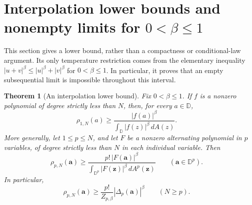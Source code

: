 \documentclass[11pt,a4paper]{article}
\numberwithin{equation}{section}
\newtheorem{theorem}{Theorem}[section]
\theoremstyle{definition}
\theoremstyle{remark}
\newcommand{\D}{\mathbb D}
\begin{document}
\section{Interpolation lower bounds and nonempty limits for \texorpdfstring{$0<\beta\le1$}{0<beta <= 1}}
\label{sec:subadditive-interpolation}

This section gives a lower bound, rather than a compactness or
conditional-law argument. Its only temperature restriction comes from
the elementary inequality $|u+v|^\beta\le |u|^\beta+|v|^\beta$ for
$0<\beta\le1$. In particular, it proves that an empty subsequential
limit is impossible throughout this interval.

\begin{theorem}[An interpolation lower bound]
\label{thm:subadditive-interpolation}
Fix $0<\beta\le1$. If $f$ is a nonzero polynomial of degree strictly
less than $N$, then, for every $a\in\D$,
\begin{equation}
 \rho_{1,N}(a)\ge
 \frac{|f(a)|^\beta}{\displaystyle\int_\D |f(z)|^\beta\,dA(z)}.
 \label{eq:subadditive-interpolation-one}
\end{equation}
More generally, let $1\le p\le N$, and let $F$ be a nonzero
alternating polynomial in $p$ variables, of degree strictly less than
$N$ in each individual variable. Then
\begin{equation}
 \rho_{p,N}(\mathbf a)\ge
 \frac{p!\,|F(\mathbf a)|^\beta}
 {\displaystyle\int_{\D^p}|F(\mathbf z)|^\beta\,dA^p(\mathbf z)}
 \qquad(\mathbf a\in\D^p).
 \label{eq:subadditive-interpolation-many}
\end{equation}
In particular,
\begin{equation}
 \rho_{p,N}(\mathbf a)\ge
 \frac{p!}{Z_{p,\beta}}|\Delta_p(\mathbf a)|^\beta
 \qquad(N\ge p).
 \label{eq:subadditive-interpolation-basic}
\end{equation}
\end{theorem}
\end{document}
